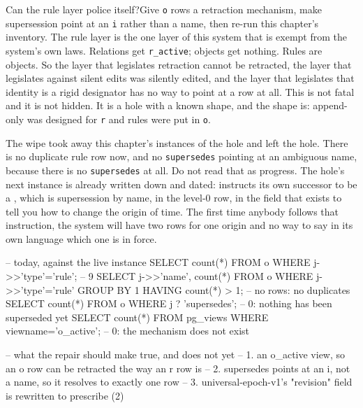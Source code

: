 \begin{Open}{Can the rule layer police itself?}{Give \texttt{o} rows a retraction mechanism, make supersession point at an \texttt{i} rather than a name, then re-run this chapter's inventory.}
The rule layer is the one layer of this system that is exempt from the system's own laws. Relations get \texttt{r\_active}; objects get nothing. Rules are objects. So the layer that legislates retraction cannot be retracted, the layer that legislates against silent edits was silently edited, and the layer that legislates that identity is a rigid designator has no way to point at a row at all. This is not fatal and it is not hidden. It is a hole with a known shape, and the shape is: append-only was designed for \texttt{r} and rules were put in \texttt{o}.

The wipe took away this chapter's instances of the hole and left the hole. There is no duplicate rule row now, and no \texttt{supersedes} pointing at an ambiguous name, because there is no \texttt{supersedes} at all. Do not read that as progress. The hole's next instance is already written down and dated:  instructs its own successor to be a , which is supersession by name, in the level-0 row, in the field that exists to tell you how to change the origin of time. The first time anybody follows that instruction, the system will have two rows for one origin and no way to say in its own language which one is in force.
\begin{Check}
-- today, against the live instance
SELECT count(*) FROM o WHERE j->>'type'='rule';       -- 9
SELECT j->>'name', count(*) FROM o WHERE j->>'type'='rule'
  GROUP BY 1 HAVING count(*) > 1;                     -- no rows: no duplicates
SELECT count(*) FROM o WHERE j ? 'supersedes';        -- 0: nothing has been superseded yet
SELECT count(*) FROM pg_views WHERE viewname='o_active';  -- 0: the mechanism does not exist

-- what the repair should make true, and does not yet
-- 1. an o_active view, so an o row can be retracted the way an r row is
-- 2. supersedes points at an i, not a name, so it resolves to exactly one row
-- 3. universal-epoch-v1's "revision" field is rewritten to prescribe (2)
\end{Check}
\end{Open}

